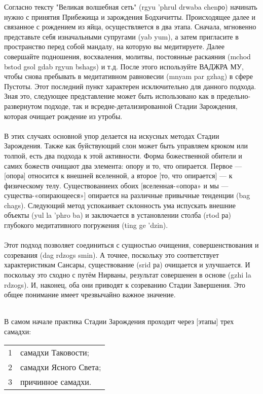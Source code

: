 Согласно тексту "Великая волшебная сеть" (rgyu 'phrul drwaba chenро) начинать
нужно с принятия Прибежища и зарождения Бодхичитты. Происходящее далее и связанное
с рождением из яйца, осуществляется в два этапа. Сначала, мгновенно представьте себя
изначальными супругами (yab yum), а затем пригласите в пространство перед собой мандалу,
на которую вы медитируете. Далее совершайте подношения, восхваления, молитвы,
постоянные раскаяния (mchod bstod gsol gdab rgyun bshags) и т.д. После этого используйте
ВАДЖРА МУ, чтобы снова пребывать в медитативном равновесии (mnyam par gzhag) в
сфере Пустоты. Этот последний пункт характерен исключительно для данного подхода.
Зная это, следующее представление может быть использовано как в предельно-развернутом
подходе, так и всредне-детализированной Стадии Зарождения, которая очищает рождение
из утробы.\\
\\
В этих случаях основной упор делается на искусных методах Стадии Зарождения.
Также как буйствующий слон может быть управляем крюком или толпой, есть два подхода к этой
активности. Форма божественной обители и самих божеств очищают два элемента: опору и
то, что опирается. Первое — [опора] относится к внешней вселенной, а второе 
[то, что опирается] — к физическому телу. Существованиеих обоих 
[вселенная-«опора» и мы — существа-«опирающееся»] опирается на различные
привычные тенденции (bag chags). Следующий метод успокаивает склонность ума
испускать внешние объекты (yul la 'phro ba) и заключается в установлении
столба (rtod ра) глубокого медитативного погружения (ting ge 'dzin).\\
\\
Этот подход позволяет соединиться с сущностью очищения, совершенствования и
созревания (dag rdzogs smin). А точнее, поскольку это соответствует характеристикам
Сансары, существование (srid ра) очищается и улучшается. И поскольку это сходно с путём
Нирваны, результат совершенен в основе (gzhi la rdzogs). И, наконец, оба они приводят к
созреванию Стадии Завершения. Это общее понимание имеет чрезвычайно важное значение.\\
\\
\begin{siderules}
\end{siderules}

\Vspace{1cm}
В самом начале практика Стадии Зарождения проходит через [этапы] трех самадхи:

\begin{tabular}{ll}
1 & самадхи Таковости;\\
2 & самадхи Ясного Света;\\
3 & причинное самадхи.\\
\end{tabular}

